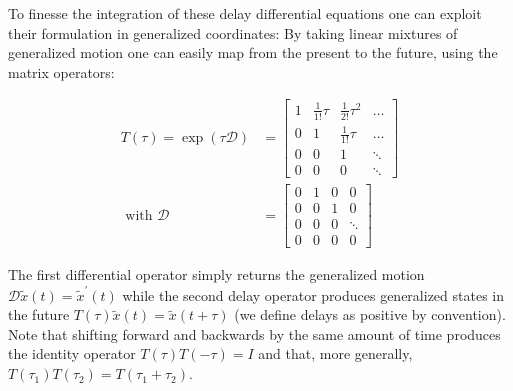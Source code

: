 \documentclass[a4paper]{article} %
\begin{document}
To finesse the integration of these delay differential equations one can
exploit their formulation in generalized coordinates: By taking linear
mixtures of generalized motion one can easily map from the present to
the future, using the matrix operators:

\begin{align}%
 T(\tau) = \exp(\tau \mathcal{D})  &=  \left[\begin{array}{cccc}1 & \frac{1}{1!}\tau & \frac{1}{2!}\tau^2 & \ldots \\0 & 1 & \frac{1}{1!}\tau & \ldots \\0 & 0 & 1 & \ddots \\0 & 0 & 0 & \ddots\end{array}\right]  \label{eq:5} \\%
 \text{ with }  \mathcal{D} &= \left[\begin{array}{cccc}0 & 1 & 0 & 0 \\0 & 0 & 1 & 0 \\0 & 0 & 0 & \ddots \\0 & 0 & 0 & 0\end{array}\right] \nonumber%
\end{align}%

The first differential operator simply returns the generalized motion $\mathcal{D}  \tilde{x}(t) = \tilde{x}^{\prime}(t)$ while the second delay operator produces generalized states in the
future $T(\tau)   \tilde{x}(t) = \tilde{x}(t+\tau)$ (we define delays as positive by convention). Note that shifting forward and backwards by the same amount of time produces the identity operator $T(\tau)  T(-\tau) = I$ and that, more generally, $T(\tau_1)  T(\tau_2) = T(\tau_1 + \tau_2)$.
\end{document}
